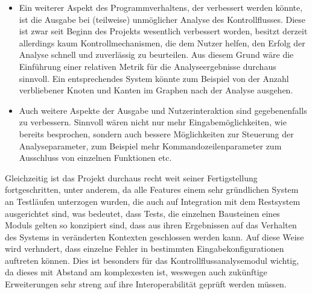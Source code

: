 \documentclass[11pt]{article}
\begin{document}
\begin{itemize}
{		kaum von Compilern verwendet werden.
	}
	\item{Ein weiterer Aspekt des Programmverhaltens, der verbessert werden könnte, ist die Ausgabe bei
		(teilweise) unmöglicher Analyse des Kontrollflusses. Diese ist zwar seit Beginn des Projekts
		wesentlich verbessert worden, besitzt derzeit allerdings kaum Kontrollmechanismen, die dem
		Nutzer helfen, den Erfolg der Analyse schnell und zuverlässig zu beurteilen. Aus diesem Grund
		wäre die Einführung einer relativen Metrik für die Analyseergebnisse durchaus sinnvoll. Ein
		entsprechendes System könnte zum Beispiel von der Anzahl verbliebener Knoten und Kanten im
		Graphen nach der Analyse ausgehen.
	}
	\item{Auch weitere Aspekte der Ausgabe und Nutzerinteraktion sind gegebenenfalls zu verbessern. Sinnvoll
		wären nicht nur mehr Eingabemöglichkeiten, wie bereits besprochen, sondern auch bessere
		Möglichkeiten zur Steuerung der Analyseparameter, zum Beispiel mehr Kommandozeilenparameter
		zum Ausschluss von einzelnen Funktionen etc.
	}
\end{itemize}
Gleichzeitig ist das Projekt durchaus recht weit seiner Fertigstellung fortgeschritten, unter
anderem, da alle Features einem sehr gründlichen System an Testläufen unterzogen wurden, die auch
auf Integration mit dem Restsystem ausgerichtet sind, was bedeutet, dass Tests, die einzelnen
Bausteinen eines Moduls gelten so konzipiert sind, dass aus ihren Ergebnissen auf das Verhalten des
Systems in veränderten Kontexten geschlossen werden kann. Auf diese Weise wird verhndert, dass
einzelne Fehler in bestimmten Eingabekonfigurationen auftreten können. Dies ist besonders für das
Kontrollflussanalysemodul wichtig, da dieses mit Abstand am komplexesten ist, weswegen auch
zukünftige Erweiterungen sehr streng auf ihre Interoperabilität geprüft werden müssen.

%
%
\end{document}
